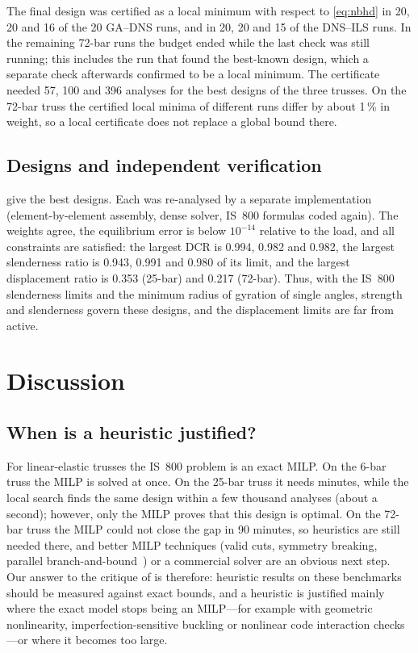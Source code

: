 \documentclass[lineno,pdflatex,sn-mathphys-num]{sn-jnl}
\begin{document}
The final design was certified as a local minimum with respect to
\cref{eq:nbhd} in 20, 20 and 16 of the 20 GA--DNS runs, and in 20, 20 and 15
of the DNS--ILS runs. In the remaining 72-bar runs the budget ended while the
last check was still running; this includes the run that found the best-known
design, which a separate check afterwards confirmed to be a local minimum. The
certificate needed 57, 100 and 396 analyses for the best designs of the three
trusses. On the 72-bar truss the certified local minima of different runs
differ by about 1\,\% in weight, so a local certificate does not replace a
global bound there.

\subsection{Designs and independent verification}
\label{sec:res-designs}
 give the best designs.
Each was re-analysed by a separate implementation (element-by-element
assembly, dense solver, IS~800 formulas coded again). The weights agree, the
equilibrium error is below $10^{-14}$ relative to the load, and all
constraints are satisfied: the largest DCR is 0.994, 0.982 and 0.982, the
largest slenderness ratio is 0.943, 0.991 and 0.980 of its limit, and the
largest displacement ratio is 0.353 (25-bar) and 0.217 (72-bar). Thus, with
the IS~800 slenderness limits and the minimum radius of gyration of single
angles, strength and slenderness govern these designs, and the displacement
limits are far from active.





\section{Discussion}
\label{sec:discussion}

\subsection{When is a heuristic justified?}
For linear-elastic trusses the IS~800 problem is an exact MILP. On the 6-bar
truss the MILP is solved at once. On the 25-bar truss it needs minutes, while
the local search finds the same design within a few thousand analyses (about a
second); however, only the MILP proves that this design is optimal. On the
72-bar truss the MILP could not close the gap in 90 minutes, so heuristics are
still needed there, and better MILP techniques (valid cuts, symmetry breaking,
parallel branch-and-bound~\citep{Rasmussen2008}) or a commercial solver are an
obvious next step. Our answer to the critique of \citet{Stolpe2016} is
therefore: heuristic results on these benchmarks should be measured against
exact bounds, and a heuristic is justified mainly where the exact model stops
being an MILP---for example with geometric nonlinearity,
imperfection-sensitive buckling or nonlinear code interaction checks---or
where it becomes too large.
\end{document}
